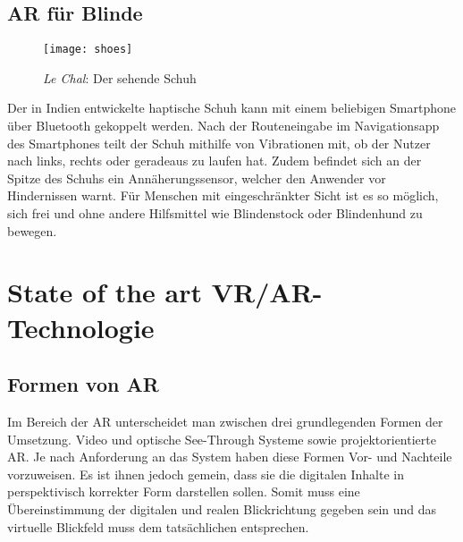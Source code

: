 \section{AR für Blinde}\label{s.shoes}
\begin{wrapfigure}{r}{0.5\textwidth}
	\vspace{-65pt}
	\begin{center}
		\texttt{[image: shoes]}
	\end{center}
	\vspace{-15pt}
	\captionsetup{width=0.42\textwidth}
	\caption{\textit{Le Chal}: Der sehende Schuh}\label{shoes}
	\vspace{-10pt}
\end{wrapfigure}
Der in Indien entwickelte haptische Schuh kann mit einem beliebigen Smartphone über Bluetooth gekoppelt werden. Nach der Routeneingabe im Navigationsapp des Smartphones teilt der Schuh mithilfe von Vibrationen mit, ob der Nutzer nach links, rechts oder geradeaus zu laufen hat. Zudem befindet sich an der Spitze des Schuhs ein Annäherungssensor, welcher den Anwender vor Hindernissen warnt. Für Menschen mit eingeschränkter Sicht ist es so möglich, sich frei und ohne andere Hilfsmittel wie Blindenstock oder Blindenhund zu bewegen.\cite{website:shoes}

\chapter{State of the art VR/AR-Technologie}\label{c.hardware}
\vspace{-20pt}
\section{Formen von AR}\label{s.formen}
Im Bereich der AR unterscheidet man zwischen drei grundlegenden Formen der Umsetzung. Video und optische See-Through Systeme sowie projektorientierte AR. Je nach Anforderung an das System haben diese Formen Vor- und Nachteile vorzuweisen. Es ist ihnen jedoch gemein, dass sie die digitalen Inhalte in perspektivisch korrekter Form darstellen sollen. Somit muss eine Übereinstimmung der digitalen und realen Blickrichtung gegeben sein und das virtuelle Blickfeld muss dem tatsächlichen entsprechen.\cite[S.~247]{doerner13}
